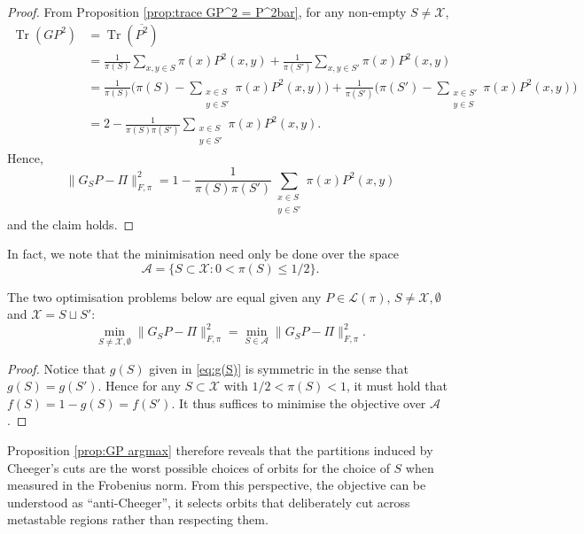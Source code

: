 \documentclass[EJP]{ejpecp} %
\DeclareMathOperator{\Tr}{Tr}
\begin{document}
\begin{proof} \label{prop:GP argmax}
    From Proposition \ref{prop:trace GP^2 = P^2bar}, for any non-empty $S \neq \mathcal{X}$,
    \begin{align*}
        \Tr(GP^2) &= \Tr(\overline{P^2})\\
        &= \frac{1}{\pi(S)} \sum_{x,y \in S} \pi(x) P^2(x,y) + \frac{1}{\pi(S')} \sum_{x,y \in S'} \pi(x) P^2(x,y)\\
        &= \frac{1}{\pi(S)} \bigg(\pi(S) -  \sum_{\substack{x \in S \\ y \in S'}} \pi(x) P^2(x,y)\bigg) + \frac{1}{\pi(S')} \bigg(\pi(S') -  \sum_{\substack{x \in S' \\ y \in S}} \pi(x) P^2(x,y)\bigg)\\
        &= 2 - \frac{1}{\pi(S) \pi(S')} \sum_{\substack{x \in S \\ y \in S'}} \pi(x) P^2(x,y).
    \end{align*}
    Hence, 
    $$\|G_S P - \Pi\|_{F, \pi}^2 = 1 - \frac{1}{\pi(S) \pi(S')} \sum_{\substack{x \in S \\ y \in S'}} \pi(x) P^2(x,y)$$
    and the claim holds. 
\end{proof}

In fact, we note that the minimisation need only be done over the space
$$\mathcal{A} = \{S \subset \mathcal{X}: 0 < \pi(S) \leq 1/2\}.$$

\begin{proposition}
    The two optimisation problems below are equal given any $P \in \mathcal{L}(\pi)$, $S \neq \mathcal{X}, \emptyset$ and $\mathcal{X} = S \sqcup S'$:
    $$\min_{S \neq \mathcal{X}, \emptyset} \|G_S P - \Pi\|_{F, \pi}^2 = \min_{S \in \mathcal{A}} \|G_S P - \Pi\|_{F, \pi}^2.$$
\end{proposition}

\begin{proof}
    Notice that $g(S)$ given in \eqref{eq:g(S)} is symmetric in the sense that $g(S) = g(S')$. Hence for any $S \subset \mathcal{X}$ with $1/2 < \pi(S) < 1$, it must hold that $f(S) = 1-g(S) = f(S').$ It thus suffices to minimise the objective over $\mathcal{A}$.
\end{proof}

Proposition \ref{prop:GP argmax} therefore reveals that the partitions induced by Cheeger's cuts are the worst possible choices of orbits for the choice of $S$ when measured in the Frobenius norm. From this perspective, the objective can be understood as ``anti-Cheeger'', it selects orbits that deliberately cut across metastable regions rather than respecting them.
\end{document}
